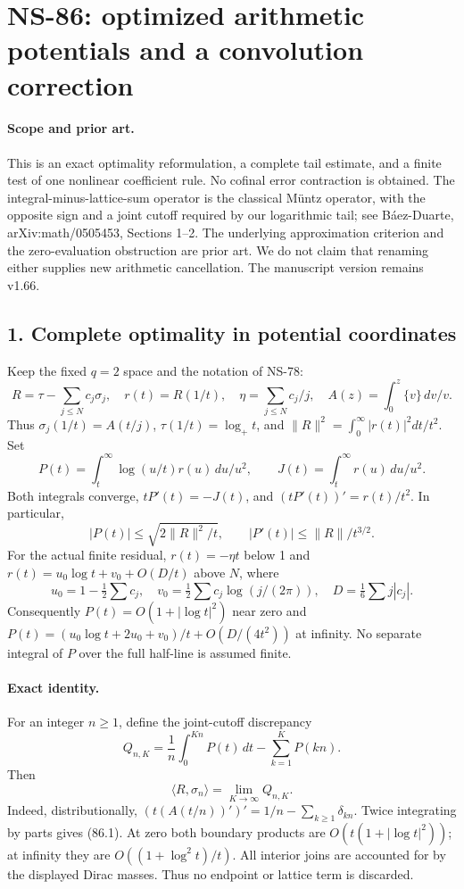 \section*{NS-86: optimized arithmetic potentials and a convolution correction}

\paragraph{Scope and prior art.}
This is an exact optimality reformulation, a complete tail estimate, and a
finite test of one nonlinear coefficient rule. No cofinal error contraction
is obtained. The integral-minus-lattice-sum operator is the classical
M\"untz operator, with the opposite sign and a joint cutoff required by
our logarithmic tail; see B\'aez-Duarte, arXiv:math/0505453, Sections 1--2.
The underlying approximation criterion and the zero-evaluation obstruction
are prior art. We do not claim that renaming either supplies new arithmetic
cancellation. The manuscript version remains v1.66.

\subsection*{1. Complete optimality in potential coordinates}
Keep the fixed $q=2$ space and the notation of NS-78:
\[
 R=\tau-\sum_{j\leq N}c_j\sigma_j,\quad r(t)=R(1/t),\quad
 \eta=\sum_{j\leq N}c_j/j,\quad A(z)=\int_0^z\{v\}\,dv/v.
\]
Thus $\sigma_j(1/t)=A(t/j)$, $\tau(1/t)=\log_+t$, and
$\|R\|^2=\int_0^\infty|r(t)|^2dt/t^2$.
Set
\[
 P(t)=\int_t^\infty \log(u/t)r(u)\,du/u^2,
 \qquad J(t)=\int_t^\infty r(u)\,du/u^2.
\]
Both integrals converge, $tP'(t)=-J(t)$, and $(tP'(t))'=r(t)/t^2$.
In particular,
\[
 |P(t)|\leq\sqrt{2\|R\|^2/t},\qquad
 |P'(t)|\leq\|R\|/t^{3/2}.
\]
For the actual finite residual, $r(t)=-\eta t$ below 1 and
$r(t)=u_0\log t+v_0+O(D/t)$ above $N$, where
\[
 u_0=1-\tfrac12\sum c_j,\quad
 v_0=\tfrac12\sum c_j\log(j/(2\pi)),\quad D=\tfrac16\sum j|c_j|.
\]
Consequently $P(t)=O(1+|\log t|^2)$ near zero and
$P(t)=(u_0\log t+2u_0+v_0)/t+O(D/(4t^2))$ at infinity.
No separate integral of $P$ over the full half-line is assumed finite.

\paragraph{Exact identity.}
For an integer $n\geq1$, define the joint-cutoff discrepancy
\[
 Q_{n,K}=\frac1n\int_0^{Kn}P(t)\,dt-\sum_{k=1}^K P(kn).
\]
Then
\begin{equation}
 \langle R,\sigma_n\rangle=\lim_{K\to\infty}Q_{n,K}.
 \tag{86.1}
\end{equation}
Indeed, distributionally,
$(t(A(t/n))')'=1/n-\sum_{k\geq1}\delta_{kn}$.
Twice integrating by parts gives (86.1). At zero both boundary products
are $O(t(1+|\log t|^2))$; at infinity they are
$O((1+\log^2t)/t)$. All interior joins are accounted for by the displayed
Dirac masses. Thus no endpoint or lattice term is discarded.

